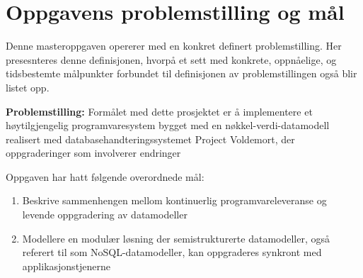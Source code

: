 \section{Oppgavens problemstilling og mål}

Denne masteroppgaven opererer med en konkret definert problemstilling. Her presesnteres denne definisjonen, hvorpå et sett med konkrete, oppnåelige, og tidsbestemte målpunkter forbundet til definisjonen av problemstillingen også blir listet opp.

\textbf{Problemstilling:} Formålet med dette prosjektet er å implementere et høytilgjengelig programvaresystem bygget med en nøkkel-verdi-datamodell realisert med databasehandteringssystemet Project Voldemort, der oppgraderinger som involverer endringer 

Oppgaven har hatt følgende overordnede mål:

\begin{enumerate}
  \item Beskrive sammenhengen mellom kontinuerlig programvareleveranse og \\ levende oppgradering av datamodeller %
  \item Modellere en modulær løsning der semistrukturerte datamodeller, også referert til som NoSQL-datamodeller, kan oppgraderes synkront med applikasjonstjenerne
\end{enumerate}




